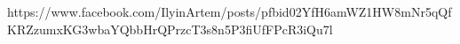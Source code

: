  
 
 
 
 

https://www.facebook.com/IlyinArtem/posts/pfbid02YfH6amWZ1HW8mNr5qQfKRZzumxKG3wbaYQbbHrQPrzcT3s8n5P3fiUfFPcR3iQu7l
